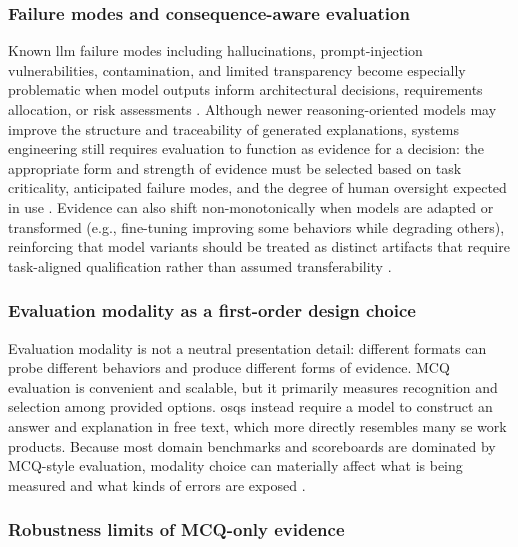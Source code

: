 \subsubsection{Failure modes and consequence-aware evaluation}\label{subsubsec:motivation_failure_modes}

Known \ac{llm} failure modes including hallucinations, prompt-injection vulnerabilities, contamination, and limited transparency become especially problematic when model outputs inform architectural decisions, requirements allocation, or risk assessments \cite{Sanu_LLM_Limitations_2024, Matarazzo2025_Survey_LLM_Capabilities_Limits, Johnson2025_Primer_LLM_Limitations}. Although newer reasoning-oriented models may improve the structure and traceability of generated explanations, systems engineering still requires evaluation to function as evidence for a decision: the appropriate form and strength of evidence must be selected based on task criticality, anticipated failure modes, and the degree of human oversight expected in use \cite{IntroducingOpenAIO1_2024, OpenAIO3mini_2025, deepseekai_deepseekR1-2025}. Evidence can also shift non-monotonically when models are adapted or transformed (e.g., fine-tuning improving some behaviors while degrading others), reinforcing that model variants should be treated as distinct artifacts that require task-aligned qualification rather than assumed transferability \cite{Wach_LLMTradeOffs_2025}.

\subsubsection{Evaluation modality as a first-order design choice}\label{subsubsec:motivation_modality_first_order}

Evaluation modality is not a neutral presentation detail: different formats can probe different behaviors and produce different forms of evidence. MCQ evaluation is convenient and scalable, but it primarily measures recognition and selection among provided options. \acp{osq} instead require a model to construct an answer and explanation in free text, which more directly resembles many \ac{se} work products. Because most domain benchmarks and scoreboards are dominated by MCQ-style evaluation, modality choice can materially affect what is being measured and what kinds of errors are exposed \cite{Tianle_Li_2024_BenchBuilder_ArenaHard_LLM_Benchmarking, Jin_Li_2024_Benchmarking_LLMs_EBM, Muharrem_Unal_2023_HELM_Holistic_Eval_LLMs}.

\subsubsection{Robustness limits of MCQ-only evidence}\label{subsubsec:motivation_mcq_robustness}

